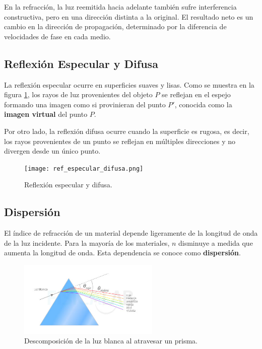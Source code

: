 En la refracción, la luz reemitida hacia adelante también sufre interferencia constructiva, pero en una dirección distinta a la original. El resultado neto es un cambio en la dirección de propagación, determinado por la diferencia de velocidades de fase en cada medio.

\subsection*{Reflexión Especular y Difusa}

La reflexión especular ocurre en superficies suaves y lisas. Como se muestra en la figura \ref{fig:ref_especular_difusa}, los rayos de luz provenientes del objeto $P$ se reflejan en el espejo formando una imagen como si provinieran del punto $P'$, conocida como la \textbf{imagen virtual} del punto $P$.

Por otro lado, la reflexión difusa ocurre cuando la superficie es rugosa, es decir, los rayos provenientes de un punto se reflejan en múltiples direcciones y no divergen desde un único punto.

\begin{figure}[H]
	\centering
	\texttt{[image: ref\_especular\_difusa.png]}
	\caption{Reflexión especular y difusa.}
	\label{fig:ref_especular_difusa}
\end{figure}

\subsection*{Dispersión}

El índice de refracción de un material depende ligeramente de la longitud de onda de la luz incidente. Para la mayoría de los materiales, $n$ disminuye a medida que aumenta la longitud de onda. Esta dependencia se conoce como \textbf{dispersión}.

\begin{figure}[H]
	\centering
	\includegraphics[width=0.6\textwidth]{images/descomposicion_luz.jpg}
	\caption{Descomposición de la luz blanca al atravesar un prisma.}
	\label{fig:dispersion_prisma_luz}
\end{figure}

